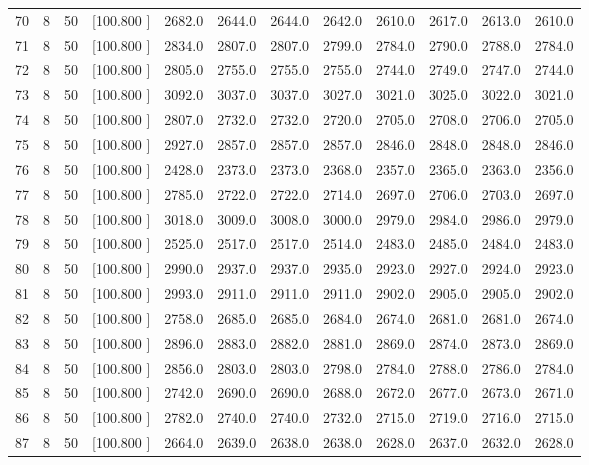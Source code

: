 \documentclass[12pt,a4paper]{article}
\begin{document}
\begin{center}
{\begin{tabular}{r r r r r r r r r r r r}
  70&  8& 50&[100.800   ]&  2682.0&  2644.0&  2644.0&  2642.0&  2610.0&  2617.0&  2613.0&  2610.0\\[-0.02in]
  71&  8& 50&[100.800   ]&  2834.0&  2807.0&  2807.0&  2799.0&  2784.0&  2790.0&  2788.0&  2784.0\\[-0.02in]
  72&  8& 50&[100.800   ]&  2805.0&  2755.0&  2755.0&  2755.0&  2744.0&  2749.0&  2747.0&  2744.0\\[-0.02in]
  73&  8& 50&[100.800   ]&  3092.0&  3037.0&  3037.0&  3027.0&  3021.0&  3025.0&  3022.0&  3021.0\\[-0.02in]
  74&  8& 50&[100.800   ]&  2807.0&  2732.0&  2732.0&  2720.0&  2705.0&  2708.0&  2706.0&  2705.0\\[-0.02in]
  75&  8& 50&[100.800   ]&  2927.0&  2857.0&  2857.0&  2857.0&  2846.0&  2848.0&  2848.0&  2846.0\\[-0.02in]
  76&  8& 50&[100.800   ]&  2428.0&  2373.0&  2373.0&  2368.0&  2357.0&  2365.0&  2363.0&  2356.0\\[-0.02in]
  77&  8& 50&[100.800   ]&  2785.0&  2722.0&  2722.0&  2714.0&  2697.0&  2706.0&  2703.0&  2697.0\\[-0.02in]
  78&  8& 50&[100.800   ]&  3018.0&  3009.0&  3008.0&  3000.0&  2979.0&  2984.0&  2986.0&  2979.0\\[-0.02in]
  79&  8& 50&[100.800   ]&  2525.0&  2517.0&  2517.0&  2514.0&  2483.0&  2485.0&  2484.0&  2483.0\\[-0.02in]
  80&  8& 50&[100.800   ]&  2990.0&  2937.0&  2937.0&  2935.0&  2923.0&  2927.0&  2924.0&  2923.0\\[-0.02in]
  81&  8& 50&[100.800   ]&  2993.0&  2911.0&  2911.0&  2911.0&  2902.0&  2905.0&  2905.0&  2902.0\\[-0.02in]
  82&  8& 50&[100.800   ]&  2758.0&  2685.0&  2685.0&  2684.0&  2674.0&  2681.0&  2681.0&  2674.0\\[-0.02in]
  83&  8& 50&[100.800   ]&  2896.0&  2883.0&  2882.0&  2881.0&  2869.0&  2874.0&  2873.0&  2869.0\\[-0.02in]
  84&  8& 50&[100.800   ]&  2856.0&  2803.0&  2803.0&  2798.0&  2784.0&  2788.0&  2786.0&  2784.0\\[-0.02in]
  85&  8& 50&[100.800   ]&  2742.0&  2690.0&  2690.0&  2688.0&  2672.0&  2677.0&  2673.0&  2671.0\\[-0.02in]
  86&  8& 50&[100.800   ]&  2782.0&  2740.0&  2740.0&  2732.0&  2715.0&  2719.0&  2716.0&  2715.0\\[-0.02in]
  87&  8& 50&[100.800   ]&  2664.0&  2639.0&  2638.0&  2638.0&  2628.0&  2637.0&  2632.0&  2628.0\\[-0.02in]

\end{tabular}}
\end{center}
\end{document}
